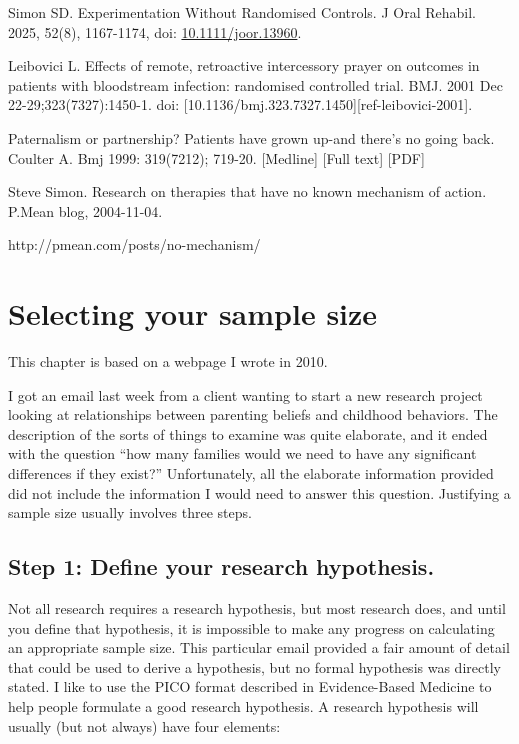\documentclass[
  letterpaper,
  DIV=11,
  numbers=noendperiod]{scrreprt}
\begin{document}
Simon SD. Experimentation Without Randomised Controls. J Oral Rehabil.
2025, 52(8), 1167-1174, doi:
\href{https://doi.org/10.1111/joor.13960}{10.1111/joor.13960}.

Leibovici L. Effects of remote, retroactive intercessory prayer on
outcomes in patients with bloodstream infection: randomised controlled
trial. BMJ. 2001 Dec 22-29;323(7327):1450-1. doi:
{[}10.1136/bmj.323.7327.1450{]}{[}ref-leibovici-2001{]}.

Paternalism or partnership? Patients have grown up-and there's no going
back. Coulter A. Bmj 1999: 319(7212); 719-20. {[}Medline{]} {[}Full
text{]} {[}PDF{]}

Steve Simon. Research on therapies that have no known mechanism of
action. P.Mean blog, 2004-11-04.

http://pmean.com/posts/no-mechanism/


\chapter{Selecting your sample size}\label{selecting-your-sample-size}

This chapter is based on a webpage I wrote in 2010.

I got an email last week from a client wanting to start a new research
project looking at relationships between parenting beliefs and childhood
behaviors. The description of the sorts of things to examine was quite
elaborate, and it ended with the question ``how many families would we
need to have any significant differences if they exist?'' Unfortunately,
all the elaborate information provided did not include the information I
would need to answer this question. Justifying a sample size usually
involves three steps.

\section{Step 1: Define your research
hypothesis.}\label{step-1-define-your-research-hypothesis.}

Not all research requires a research hypothesis, but most research does,
and until you define that hypothesis, it is impossible to make any
progress on calculating an appropriate sample size. This particular
email provided a fair amount of detail that could be used to derive a
hypothesis, but no formal hypothesis was directly stated. I like to use
the PICO format described in Evidence-Based Medicine to help people
formulate a good research hypothesis. A research hypothesis will usually
(but not always) have four elements:
\end{document}
